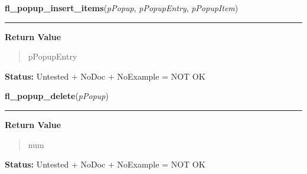     \vspace{0.5ex}

\hspace{.8\funcindent}\begin{boxedminipage}{\funcwidth}

    \raggedright \textbf{fl\_popup\_insert\_items}(\textit{pPopup}, \textit{pPopupEntry}, \textit{pPopupItem})

    \vspace{-1.5ex}

    \rule{\textwidth}{0.5\fboxrule}
\setlength{\parskip}{2ex}
\setlength{\parskip}{1ex}
      \textbf{Return Value}
    \vspace{-1ex}

      \begin{quote}
      pPopupEntry

      \end{quote}

\textbf{Status:} Untested + NoDoc + NoExample = NOT OK



    \end{boxedminipage}

    \label{xformslib:library:fl_popup_delete}

    \vspace{0.5ex}

\hspace{.8\funcindent}\begin{boxedminipage}{\funcwidth}

    \raggedright \textbf{fl\_popup\_delete}(\textit{pPopup})

    \vspace{-1.5ex}

    \rule{\textwidth}{0.5\fboxrule}
\setlength{\parskip}{2ex}
\setlength{\parskip}{1ex}
      \textbf{Return Value}
    \vspace{-1ex}

      \begin{quote}
      num

      \end{quote}

\textbf{Status:} Untested + NoDoc + NoExample = NOT OK



    \end{boxedminipage}

    \label{xformslib:library:fl_popup_entry_delete}

